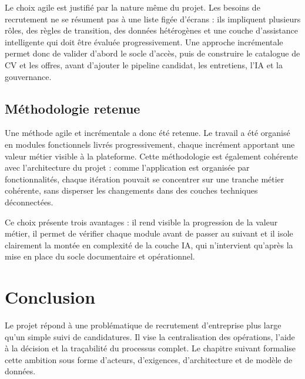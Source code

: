 Le choix agile est justifié par la nature même du projet. Les besoins de recrutement ne se résument pas à une liste figée d'écrans : ils impliquent plusieurs rôles, des règles de transition, des données hétérogènes et une couche d'assistance intelligente qui doit être évaluée progressivement. Une approche incrémentale permet donc de valider d'abord le socle d'accès, puis de construire le catalogue de CV et les offres, avant d'ajouter le pipeline candidat, les entretiens, l'IA et la gouvernance.

\subsection{Méthodologie retenue}
Une méthode agile et incrémentale a donc été retenue. Le travail a été organisé en modules fonctionnels livrés progressivement, chaque incrément apportant une valeur métier visible à la plateforme. Cette méthodologie est également cohérente avec l'architecture du projet : comme l'application est organisée par fonctionnalités, chaque itération pouvait se concentrer sur une tranche métier cohérente, sans disperser les changements dans des couches techniques déconnectées.

Ce choix présente trois avantages : il rend visible la progression de la valeur métier, il permet de vérifier chaque module avant de passer au suivant et il isole clairement la montée en complexité de la couche IA, qui n'intervient qu'après la mise en place du socle documentaire et opérationnel.

\section*{Conclusion}
Le projet \projectname{} répond à une problématique de recrutement d'entreprise plus large qu'un simple suivi de candidatures. Il vise la centralisation des opérations, l'aide à la décision et la traçabilité du processus complet. Le chapitre suivant formalise cette ambition sous forme d'acteurs, d'exigences, d'architecture et de modèle de données.
